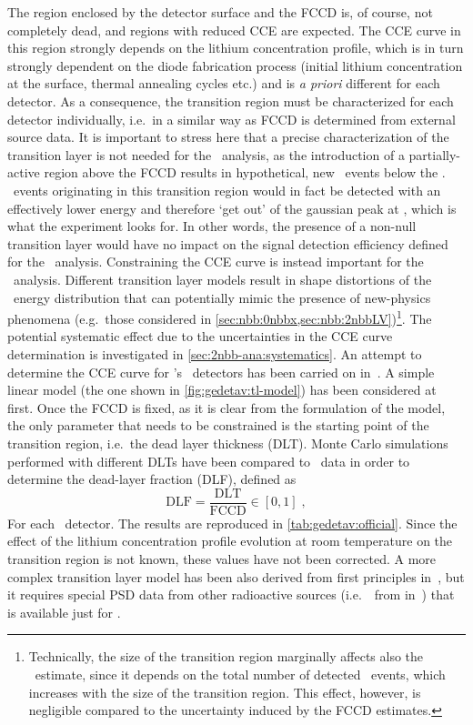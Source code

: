 The region enclosed by the detector surface and the FCCD is, of course, not completely
dead, and regions with reduced CCE are expected. The CCE curve in this region strongly
depends on the lithium concentration profile, which is in turn strongly dependent on the
diode fabrication process (initial lithium concentration at the surface, thermal annealing
cycles etc.) and is \emph{a priori} different for each detector. As a consequence, the
transition region must be characterized for each detector individually, i.e.~in a similar
way as FCCD is determined from external source data.
\newpar
It is important to stress here that a precise characterization of the transition layer is
not needed for the \onbb\ analysis, as the introduction of a partially-active region above
the FCCD results in hypothetical, new \onbb\ events below the \qbb. \onbb\ events
originating in this transition region would in fact be detected with an effectively lower
energy and therefore `get out' of the gaussian peak at \qbb, which is what the experiment
looks for. In other words, the presence of a non-null transition layer would have no
impact on the signal detection efficiency defined for the \onbb\ analysis. Constraining
the CCE curve is instead important for the \nnbb\ analysis. Different transition layer
models result in shape distortions of the \nnbb\ energy distribution that can potentially
mimic the presence of new-physics phenomena (e.g.~those considered in
\cref{sec:nbb:0nbbx,sec:nbb:2nbbLV})\footnote{%
  Technically, the size of the transition region marginally affects also the \thalftwo\
  estimate, since it depends on the total number of detected \nnbb\ events, which
  increases with the size of the transition region. This effect, however, is negligible
  compared to the uncertainty induced by the FCCD estimates.
}. The potential systematic effect due to the uncertainties in the CCE curve determination
is investigated in \cref{sec:2nbb-ana:systematics}.
\newpar
An attempt to determine the CCE curve for \gerda's \bege\ detectors has been carried on
in~\cite{Lehnert2016}. A simple linear model (the one shown in
\cref{fig:gedetav:tl-model}) has been considered at first. Once the FCCD is fixed, as it
is clear from the formulation of the model, the only parameter that needs to be
constrained is the starting point of the transition region, i.e.~the dead layer thickness
(DLT). Monte Carlo simulations performed with different DLTs have been compared to \Am\
data in order to determine the dead-layer fraction (DLF), defined as
\[
  \text{DLF} = \frac{\text{DLT}}{\text{FCCD}} \in [0,1] \;,
\]
For each \bege\ detector. The results are reproduced in \cref{tab:gedetav:official}. Since
the effect of the lithium concentration profile evolution at room temperature on the
transition region is not known, these values have not been corrected. A more complex
transition layer model has been also derived from first principles in~\cite{Lehnert2016},
but it requires special PSD data from other radioactive sources (i.e.~\aoe\ from
\nuc{Sr}{90} in~\cite{Lehnert2016}) that is available just for \GD{91C}.


